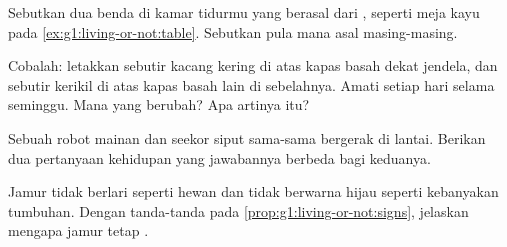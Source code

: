 \begin{exercise}[$\star$]\label{exo:g1:living-or-not:7}
Sebutkan dua benda di kamar tidurmu yang berasal dari ,
seperti meja kayu pada \cref{ex:g1:living-or-not:table}. Sebutkan pula
 mana asal masing-masing.
\end{exercise}

\begin{exercise}[$\star$]\label{exo:g1:living-or-not:8}
Cobalah: letakkan sebutir kacang kering di atas kapas basah dekat
jendela, dan sebutir kerikil di atas kapas basah lain di sebelahnya.
Amati setiap hari selama seminggu. Mana yang berubah? Apa artinya itu?
\end{exercise}

\begin{exercise}[$\star\star$]\label{exo:g1:living-or-not:9}
Sebuah robot mainan dan seekor siput sama-sama bergerak di lantai.
Berikan dua pertanyaan kehidupan yang jawabannya berbeda bagi keduanya.
\end{exercise}

\begin{exercise}[$\star\star$]\label{exo:g1:living-or-not:10}
Jamur tidak berlari seperti hewan dan tidak berwarna hijau seperti
kebanyakan tumbuhan. Dengan tanda-tanda pada
\cref{prop:g1:living-or-not:signs}, jelaskan mengapa jamur tetap
.
\end{exercise}
